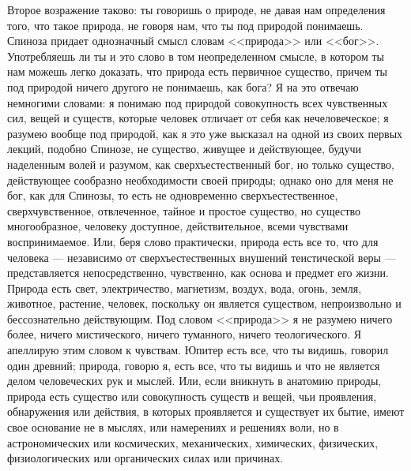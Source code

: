 \documentclass[12pt]{article}
\begin{document}
Второе возражение таково: ты говоришь о природе, не давая нам определения того, что такое природа, не говоря нам, что ты под природой понимаешь. Спиноза придает однозначный смысл словам <<природа>>  или <<бог>>. Употребляешь ли ты и это слово в том неопределенном смысле, в котором ты нам можешь легко доказать, что природа есть первичное существо, причем ты под природой ничего другого не понимаешь, как бога? Я на это отвечаю немногими словами: я понимаю под природой совокупность всех чувственных сил, вещей и существ, которые человек отличает от себя как нечеловеческое; я разумею вообще под природой, как я это уже высказал на одной из своих первых лекций, подобно Спинозе, не существо, живущее и действующее, будучи наделенным волей и разумом, как сверхъестественный бог, но только существо, действующее сообразно необходимости своей природы; однако оно для меня не бог, как для Спинозы, то есть не одновременно сверхъестественное, сверхчувственное, отвлеченное, тайное и простое существо, но существо многообразное, человеку доступное, действительное, всеми чувствами воспринимаемое. Или, беря слово практически, природа есть все то, что для человека --- независимо от сверхъестественных внушений теистической веры --- представляется непосредственно, чувственно, как основа и предмет его жизни. Природа есть свет, электричество, магнетизм, воздух, вода, огонь, земля, животное, растение, человек, поскольку он является существом, непроизвольно и бессознательно действующим. Под словом <<природа>> я не разумею ничего более, ничего мистического, ничего туманного, ничего теологического. Я апеллирую этим словом к чувствам. Юпитер есть все, что ты видишь, говорил один древний; природа, говорю я, есть все, что ты видишь и что не является делом человеческих рук и мыслей. Или, если вникнуть в анатомию природы, природа есть существо или совокупность существ и вещей, чьи проявления, обнаружения или действия, в которых проявляется и существует их бытие, имеют свое основание не в мыслях, или намерениях и решениях воли, но в астрономических или космических, механических, химических, физических, физиологических или органических силах или причинах. 
\end{document}
